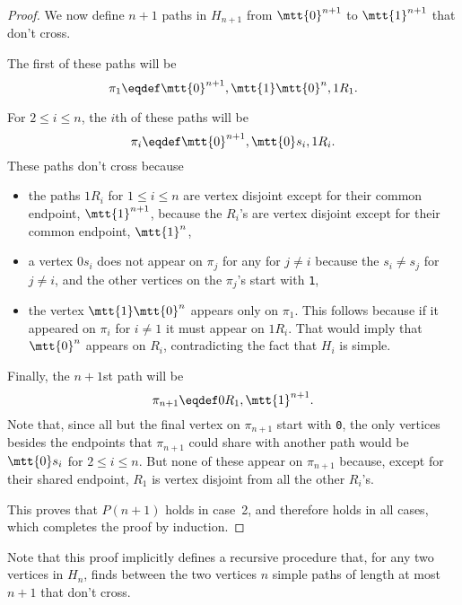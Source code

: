 \begin{problem}
\begin{solution}
\begin{proof}
We now define $n+1$ paths in $H_{n+1}$ from $\mtt{0}^{n+1}$ to
$\mtt{1}^{n+1}$ that don't cross.

The first of these paths will be
\[
\pi_1 \eqdef \mtt{0}^{n+1}, \mtt{1}\mtt{0}^{n}, 1R_1.
\]

For $2 \leq i \leq n$, the $i$th of these paths will be
\[
\pi_i \eqdef \mtt{0}^{n+1}, \mtt{0}s_i, 1R_i.
\]
These paths don't cross because

\begin{itemize}

\item the paths $1R_i$ for $1 \leq i \leq n$ are vertex disjoint except
  for their common endpoint, $\mtt{1}^{n+1}$, because the $R_i$'s are
  vertex disjoint except for their common endpoint, $\mtt{1}^n$,

\item a vertex $0s_i$ does not appear on $\pi_j$ for any for $j \neq i$
  because the $s_i \neq s_j$ for $j \neq i$, and the other vertices on
  the $\pi_j$'s start with \texttt{1},

\item the vertex $\mtt{1}\mtt{0}^{n}$ appears only on $\pi_1$.  This follows
  because if it appeared on $\pi_i$ for $i \neq 1$ it must appear on $1R_i$.
  That would imply that $\mtt{0}^{n}$ appears on $R_i$, contradicting the
  fact that $H_i$ is simple.

\end{itemize}      

Finally, the $n+1$st path will be
\[
\pi_{n+1} \eqdef 0R_1, \mtt{1}^{n+1}.
\]
Note that, since all but the final vertex on $\pi_{n+1}$ start with
\texttt{0}, the only vertices besides the endpoints that $\pi_{n+1}$ could
share with another path would be $\mtt{0}s_i$ for $2 \leq i \leq n$.  But
none of these appear on $\pi_{n+1}$ because, except for their shared
endpoint, $R_1$ is vertex disjoint from all the other $R_i$'s.

This proves that $P(n+1)$ holds in case~2, and therefore holds in all
cases, which completes the proof by induction.
\end{proof}

Note that this proof implicitly defines a recursive procedure that, for
any two vertices in $H_n$, finds between the two vertices $n$ simple paths
of length at most $n+1$ that don't cross.\end{solution} 

\eparts

\end{problem}
